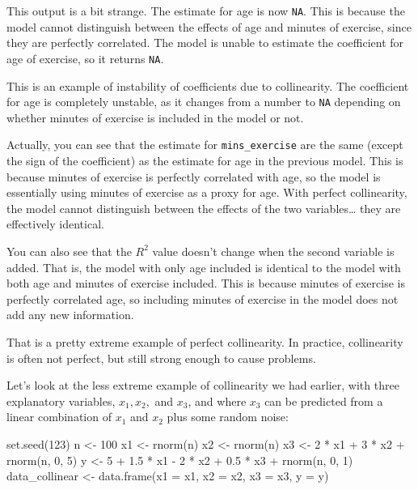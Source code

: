 \documentclass[
  letterpaper,
  8pt,
  a4paper]{book}
\newenvironment{Shaded}{\begin{snugshade}}{\end{snugshade}}
\newcommand{\AttributeTok}[1]{\textcolor[rgb]{0.40,0.45,0.13}{#1}}
\newcommand{\DecValTok}[1]{\textcolor[rgb]{0.68,0.00,0.00}{#1}}
\newcommand{\FloatTok}[1]{\textcolor[rgb]{0.68,0.00,0.00}{#1}}
\newcommand{\FunctionTok}[1]{\textcolor[rgb]{0.28,0.35,0.67}{#1}}
\newcommand{\NormalTok}[1]{\textcolor[rgb]{0.00,0.23,0.31}{#1}}
\newcommand{\OtherTok}[1]{\textcolor[rgb]{0.00,0.23,0.31}{#1}}
\newcommand{\SpecialCharTok}[1]{\textcolor[rgb]{0.37,0.37,0.37}{#1}}
\begin{document}
This output is a bit strange. The estimate for age is now \texttt{NA}.
This is because the model cannot distinguish between the effects of age
and minutes of exercise, since they are perfectly correlated. The model
is unable to estimate the coefficient for age of exercise, so it returns
\texttt{NA}.

This is an example of instability of coefficients due to collinearity.
The coefficient for age is completely unstable, as it changes from a
number to \texttt{NA} depending on whether minutes of exercise is
included in the model or not.

Actually, you can see that the estimate for \texttt{mins\_exercise} are
the same (except the sign of the coefficient) as the estimate for age in
the previous model. This is because minutes of exercise is perfectly
correlated with age, so the model is essentially using minutes of
exercise as a proxy for age. With perfect collinearity, the model cannot
distinguish between the effects of the two variables\ldots{} they are
effectively identical.

You can also see that the \(R^2\) value doesn't change when the second
variable is added. That is, the model with only age included is
identical to the model with both age and minutes of exercise included.
This is because minutes of exercise is perfectly correlated age, so
including minutes of exercise in the model does not add any new
information.

That is a pretty extreme example of perfect collinearity. In practice,
collinearity is often not perfect, but still strong enough to cause
problems.

Let's look at the less extreme example of collinearity we had earlier,
with three explanatory variables, \(x_1, x_2,\) and \(x_3\), and where
\(x_3\) can be predicted from a linear combination of \(x_1\) and
\(x_2\) plus some random noise:

\begin{Shaded}
\begin{Highlighting}[]
\FunctionTok{set.seed}\NormalTok{(}\DecValTok{123}\NormalTok{)}
\NormalTok{n }\OtherTok{\textless{}{-}} \DecValTok{100}
\NormalTok{x1 }\OtherTok{\textless{}{-}} \FunctionTok{rnorm}\NormalTok{(n)}
\NormalTok{x2 }\OtherTok{\textless{}{-}} \FunctionTok{rnorm}\NormalTok{(n)}
\NormalTok{x3 }\OtherTok{\textless{}{-}} \DecValTok{2} \SpecialCharTok{*}\NormalTok{ x1 }\SpecialCharTok{+} \DecValTok{3} \SpecialCharTok{*}\NormalTok{ x2 }\SpecialCharTok{+} \FunctionTok{rnorm}\NormalTok{(n, }\DecValTok{0}\NormalTok{, }\DecValTok{5}\NormalTok{)}
\NormalTok{y }\OtherTok{\textless{}{-}} \DecValTok{5} \SpecialCharTok{+} \FloatTok{1.5} \SpecialCharTok{*}\NormalTok{ x1 }\SpecialCharTok{{-}} \DecValTok{2} \SpecialCharTok{*}\NormalTok{ x2 }\SpecialCharTok{+} \FloatTok{0.5} \SpecialCharTok{*}\NormalTok{ x3 }\SpecialCharTok{+} \FunctionTok{rnorm}\NormalTok{(n, }\DecValTok{0}\NormalTok{, }\DecValTok{1}\NormalTok{)}
\NormalTok{data\_collinear }\OtherTok{\textless{}{-}} \FunctionTok{data.frame}\NormalTok{(}\AttributeTok{x1 =}\NormalTok{ x1, }\AttributeTok{x2 =}\NormalTok{ x2, }\AttributeTok{x3 =}\NormalTok{ x3, }\AttributeTok{y =}\NormalTok{ y)}
\end{Highlighting}
\end{Shaded}
\end{document}
